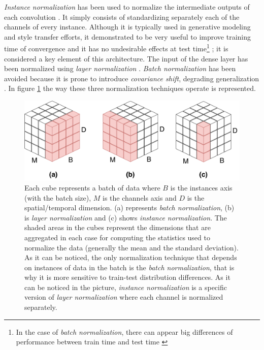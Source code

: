 \textit{Instance normalization}  has been used to normalize the intermediate outputs of each convolution \autocite{Ulyanov2016, Zheng2018}. It simply consists of standardizing separately each of the channels of every instance. Although it is typically used in generative modeling and style transfer efforts, it demonstrated to be very useful to improve training time of convergence and it has no undesirable effects at test time\footnote{In the case of \textit{batch normalization}, there can appear big differences of performance between train time and test time \autocite{Ba2016}} \autocite{Ulyanov2016}; it is considered a key element of this architecture. The input of the dense layer has been normalized using \textit{layer normalization} \autocite{Ba2016}. \textit{Batch normalization} \autocite{ioffe2015} has been avoided because it is prone to introduce \textit{covariance shift}, degrading generalization \autocite{Ba2016}. In figure \ref{fig:normcubes} the way these three normalization techniques operate is represented.



\begin{figure}[ht]
	\centering
	\includegraphics[width=0.7\linewidth]{kws/images/normcubes}
	\caption[Batch, instance and layer normalization diagrams]{Each cube represents a batch of data where $B$ is the instances axis (with the batch size), $M$ is the channels axis and $D$ is the spatial/temporal dimension. (a) represents \textit{batch normalization}, (b) is \textit{layer normalization} and (c) shows \textit{instance normalization}. The shaded areas in the cubes represent the dimensions that are aggregated in each case for computing the statistics used to normalize the data (generally the mean and the standard deviation). As it can be noticed, the only normalization technique that depends on instances of data in the batch is the \textit{batch normalization}, that is why it is more sensitive to train-test distribution differences. As it can be noticed in the picture, \textit{instance normalization} is a specific version of \textit{layer normalization} where each channel is normalized separately.}
	\label{fig:normcubes}
\end{figure}




